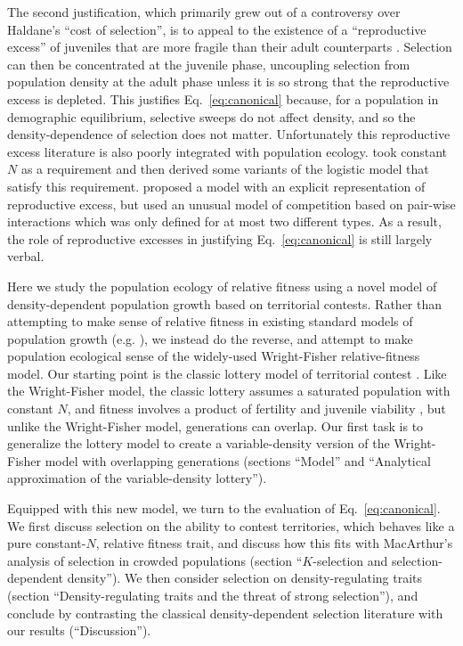\documentclass[12pt]{article}
\begin{document}
The second justification, which primarily grew out of a controversy over Haldane's ``cost of selection'', is to appeal to the existence of a ``reproductive excess'' of juveniles that are more fragile than their adult counterparts \citep{turner1968population,kimura1969natural,nei1971fertility}. Selection can then be concentrated at the juvenile phase, uncoupling selection from population density at the adult phase unless it is so strong that the reproductive excess is depleted. This justifies Eq.~\eqref{eq:canonical} because, for a population in demographic equilibrium, selective sweeps do not affect density, and so the density-dependence of selection does not matter. Unfortunately this reproductive excess literature is also poorly integrated with population ecology. \cite{kimura1969natural} took constant $N$ as a requirement and then derived some variants of the logistic model that satisfy this requirement. \cite{nei1971fertility} proposed a model with an explicit representation of reproductive excess, but used an unusual model of competition based on pair-wise interactions which was only defined for at most two different types. As a result, the role of reproductive excesses in justifying Eq.~\eqref{eq:canonical} is still largely verbal.

Here we study the population ecology of relative fitness using a novel model of density-dependent population growth based on territorial contests. Rather than attempting to make sense of relative fitness in existing standard models of population growth (e.g. \citep{kimura1969natural,mallet_2012}), we instead do the reverse, and attempt to make population ecological sense of the widely-used Wright-Fisher relative-fitness model. Our starting point is the classic lottery model of territorial contest \citep{sale_77,chesson_1981}. Like the Wright-Fisher model, the classic lottery assumes a saturated population with constant $N$, and fitness involves a product of fertility and juvenile viability \citep[pp. 185]{crow_1970}, but unlike the Wright-Fisher model, generations can overlap. Our first task is to generalize the lottery model to create a variable-density version of the Wright-Fisher model with overlapping generations (sections ``Model'' and ``Analytical approximation of the variable-density lottery''). 

Equipped with this new model, we turn to the evaluation of Eq.~\eqref{eq:canonical}. We first discuss selection on the ability to contest territories, which behaves like a pure constant-$N$, relative fitness trait, and discuss how this fits with MacArthur's analysis of selection in crowded populations (section ``$K$-selection and selection-dependent density''). We then consider selection on density-regulating traits (section ``Density-regulating traits and the threat of strong selection''), and conclude by contrasting the classical density-dependent selection literature with our results (``Discussion'').
 
\end{document}
